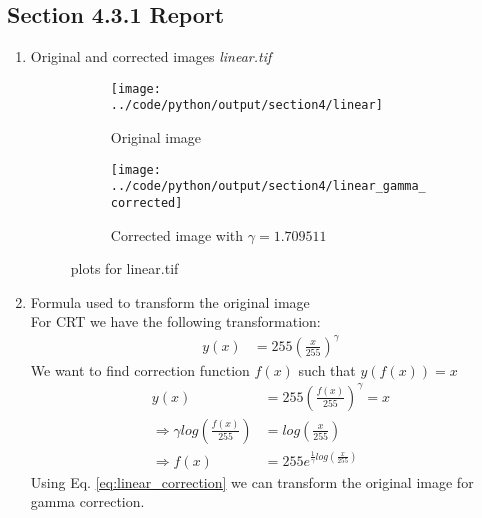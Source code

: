 \documentclass[a4paper,11pt]{article}
\newcommand{\refEq}[1]{Eq. \ref{#1}}
\begin{document}
\subsection*{Section 4.3.1 Report} 
\begin{enumerate}
\item Original and corrected images \textit{linear.tif}
\begin{figure}[!hp]
 \centering
\begin{subfigure}{0.45\textwidth}
 \centering
 \texttt{[image: ../code/python/output/section4/linear]}
 \caption{Original image}
\end{subfigure}
\begin{subfigure}{0.45\textwidth}
 \centering
 \texttt{[image: ../code/python/output/section4/linear\_gamma\_corrected]}
 \caption{Corrected image with $\gamma=1.709511$}
\end{subfigure} 
 \caption{plots for linear.tif}
\end{figure}

\item Formula used to transform the original image\\

 For CRT we have the following transformation:\vspace{-2ex}
 \begin{align}
 y(x) &= 255(\frac{x}{255})^{\gamma} \label{eq:crt}
 \end{align}
 We want to find correction function $f(x)$ such that $y(f(x))=x$\vspace{-2ex}
 \begin{align}
 y(x) &= 255(\frac{f(x)}{255})^{\gamma}=x\nonumber\\
 \Rightarrow \gamma log(\frac{f(x)}{255}) &= log(\frac{x}{255})\nonumber\\
 \Rightarrow f(x) &= 255e^{\frac{1}{\gamma}log(\frac{x}{255})} \label{eq:linear_correction}
\end{align}
Using \refEq{eq:linear_correction} we can transform the original image for gamma correction.

\end{enumerate}

%
\clearpage
\vspace{2ex}
%
\end{document}
